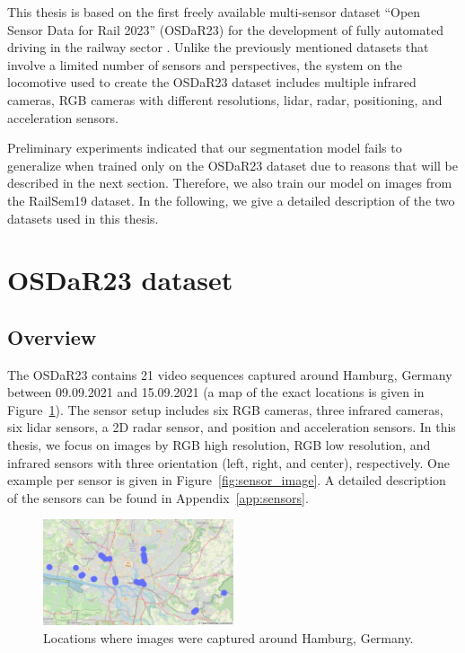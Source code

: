\documentclass[Master,MDS,english]{BASE/twbook} %
\begin{document}
This thesis is based on the first freely available multi-sensor dataset ``Open Sensor Data for Rail 2023'' (OSDaR23) for the development of fully automated driving in the railway sector \citep{DB2023, tagiew2023osdar23}.
Unlike the previously mentioned datasets that involve a limited number of sensors and perspectives, the system on the locomotive used to create the OSDaR23 dataset includes multiple infrared cameras, RGB cameras with different resolutions, lidar, radar, positioning, and acceleration sensors.

Preliminary experiments indicated that our segmentation model fails to generalize when trained only on the OSDaR23 dataset due to reasons that will be described in the next section. Therefore, we also train our model on images from the RailSem19 dataset.
In the following, we give a detailed description of the two datasets used in this thesis.


\section{OSDaR23 dataset} \label{sec:OSDaR23}

\subsection{Overview}

The OSDaR23 contains 21 video sequences captured around Hamburg, Germany between 09.09.2021 and 15.09.2021 (a map of the exact locations is given in Figure~\ref{fig:map}). 
The sensor setup includes six RGB cameras, three infrared cameras, six lidar sensors, a 2D radar sensor, and position and acceleration sensors. In this thesis, we focus on images by RGB high resolution, RGB low resolution, and infrared sensors with three orientation (left, right, and center), respectively. One example per sensor is given in Figure~\ref{fig:sensor_image}. A detailed description of the sensors can be found in Appendix~\ref{app:sensors}.

\begin{figure}[h]
\centering
\includegraphics[width=0.5\textwidth]{images/datasets/db/map}
\caption{Locations where images were captured around Hamburg, Germany. }
\label{fig:map}
\end{figure}
\end{document}
